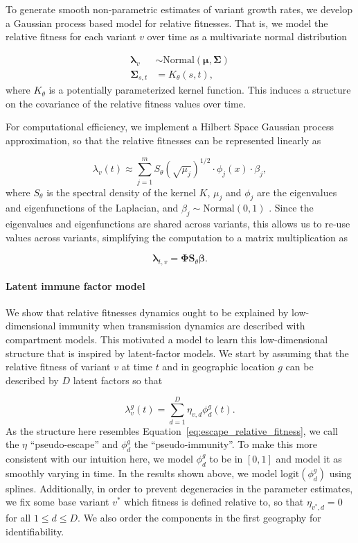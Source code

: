 \documentclass[12pt,oneside,letterpaper]{article}
\renewcommand{\vec}[1]{\boldsymbol{#1}}
\begin{document}
To generate smooth non-parametric estimates of variant growth rates, we develop a Gaussian process based model for relative fitnesses. 
That is, we model the relative fitness for each variant $v$ over time as a multivariate normal distribution

\begin{align*}
    \vec{\lambda}_{v} &\sim \text{Normal}(\vec{\mu}, \vec{\Sigma})\\
    \vec{\Sigma}_{s, t} &= K_{\theta}(s, t),
\end{align*}
where $K_{\theta}$ is a potentially parameterized kernel function. 
This induces a structure on the covariance of the relative fitness values over time.

For computational efficiency, we implement a Hilbert Space Gaussian process approximation, so that the relative fitnesses can be represented linearly as

\begin{equation}
    \lambda_{v}(t) \approx \sum_{j=1}^{m} S_{\theta}(\sqrt{\mu_{j}})^{1/2} \cdot \phi_{j}(x) \cdot \beta_{j},
\end{equation}
where $S_{\theta}$ is the spectral density of the kernel $K$, $\mu_{j}$ and $\phi_{j}$ are the eigenvalues and eigenfunctions of the Laplacian, and $\beta_{j} \sim \text{Normal}(0,1)$ \cite{riutortmayol2022practical}.
Since the eigenvalues and eigenfunctions are shared across variants, this allows us to re-use values across variants, simplifying the computation to a matrix multiplication as

\begin{equation*}
    \vec{\lambda}_{t,v} = \vec{\Phi}\vec{S}_{\theta}\vec{\beta}.
\end{equation*}


\paragraph{Latent immune factor model}%

We show that relative fitnesses dynamics ought to be explained by low-dimensional immunity when transmission dynamics are described with compartment models.
This motivated a model to learn this low-dimensional structure that is inspired by latent-factor models. We start by assuming that the relative fitness of variant $v$ at time $t$ and in geographic location $g$ can be described by $D$ latent factors so that

\begin{equation}
    \lambda_{v}^{g}(t) = \sum_{d=1}^{D} \eta_{v,d} \phi_{d}^{g}(t). 
\end{equation}
As the structure here resembles Equation~\ref{eq:escape_relative_fitness}, we call the $\eta$ ``pseudo-escape'' and $\phi_{d}^{g}$ the ``pseudo-immunity''.
To make this more consistent with our intuition here, we model $\phi_{d}^{g}$ to be in $[0,1]$ and model it as smoothly varying in time.
In the results shown above, we model $\text{logit}(\phi_{d}^{g})$ using splines.
Additionally, in order to prevent degeneracies in the parameter estimates, we fix some base variant $v^*$ which fitness is defined relative to, so that $\eta_{v^*, d} = 0$ for all $1\leq d\leq D$.
We also order the components in the first geography for identifiability.
\end{document}
